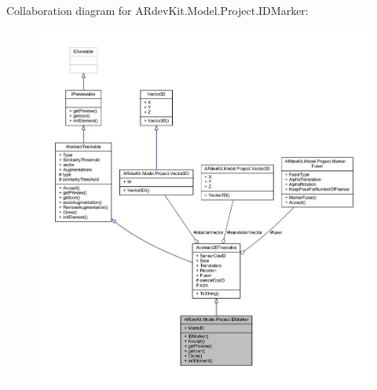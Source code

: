 Collaboration diagram for A\-Rdev\-Kit.\-Model.\-Project.\-I\-D\-Marker\-:
\nopagebreak
\begin{figure}[H]
\begin{center}
\leavevmode
\includegraphics[width=350pt]{class_a_rdev_kit_1_1_model_1_1_project_1_1_i_d_marker__coll__graph}
\end{center}
\end{figure}
